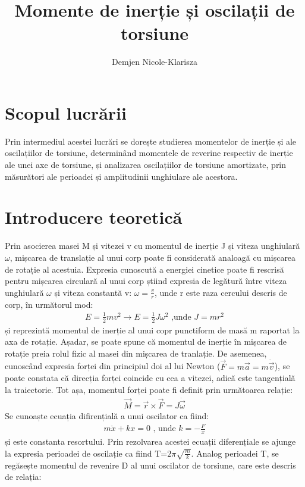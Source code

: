 \documentclass[a4paper,12pt]{article}
\title{Momente de inerție și oscilații de torsiune}
\author{Demjen Nicole-Klarisza}
\date{}
\begin{document}
\maketitle
\newpage
{}
\section{Scopul lucrării}
Prin intermediul acestei lucrări se dorește studierea momentelor de inerție și ale oscilațiilor de torsiune, determinând momentele de reverine respectiv de inerție ale unei axe de torsiune, și analizarea oscilațiilor de torsiune amortizate, prin măsurători ale perioadei și amplitudinii unghiulare ale acestora.
\section{Introducere teoretică}
Prin asocierea masei M și vitezei v cu momentul de inerție J și viteza unghiulară $\omega$, mișcarea de translație al unui corp poate fi considerată analoagă cu mișcarea de rotație al acestuia. Expresia cunoscută a energiei cinetice  poate fi rescrisă pentru mișcarea circulară al unui corp știind expresia de legătură între viteza unghiulară $\omega$ și viteza constantă v: $\omega=\frac{v}{r}$, unde r este raza cercului descris de corp, în următorul mod:
\begin{align}
E=\frac{1}{2}mv^2 \rightarrow  E=\frac{1}{2}J\omega^2 \text{ ,unde  } J=mr^2
\end{align}
și reprezintă momentul de inerție al unui copr punctiform de masă m raportat la axa de rotație. Așadar, se poate spune că momentul de inerție în mișcarea de rotație preia rolul fizic al masei din mișcarea de tranlație. De asemenea, cunoscând expresia forței din principiul doi al lui Newton ($\vec{F}=m\vec{a}=m\dot{\vec{v}}$), se poate constata că direcția forței coincide cu cea a vitezei, adică este tangențială la traiectorie. Tot așa, momentul forței poate fi definit prin următoarea relație:
\begin{align}
\vec{M}=\vec{r} \times \vec{F}=J\dot{\vec{\omega}}
\end{align}
Se cunoaște ecuația difirențială a unui oscilator ca fiind:
\begin{align}
m\ddot{x}+kx=0 \text{ , unde  } k=-\frac{F}{x} 
\end{align}
și este constanta resortului. Prin rezolvarea acestei ecuații diferențiale se ajunge la expresia perioadei de oscilație ca fiind T=$2\pi\sqrt{\frac{m}{k}}$. Analog perioadei T,  se regăsește momentul de revenire D al unui oscilator de torsiune, care este descris de relația:
\end{document}
